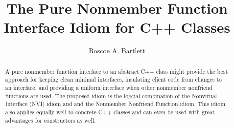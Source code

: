 \documentclass[pdf,ps2pdf,11pt]{SANDreport}
\title{\center
The Pure Nonmember Function Interface Idiom for C++ Classes}
\author{Roscoe A. Bartlett}
\date{}
\begin{document}
\maketitle

%

%
\begin{abstract}
%
A pure nonmember function interface to an abstract C++ class might provide the
best approach for keeping clean minimal interfaces, insulating client code
from changes to an interface, and providing a uniform interface when other
nonmember nonfriend functions are used.  The proposed idiom is the logcial
combination of the Nonvirual Interface (NVI) idiom and and the Nonmember
Nonfriend Function idiom.  This idiom also applies equally well to concrete
C++ classes and can even be used with great advantages for constructors as
well.
%
\end{abstract}
%

%
%
%

%
\clearpage
\tableofcontents

\end{document}
